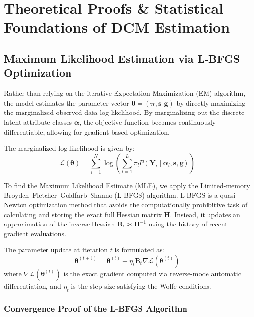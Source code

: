 \documentclass[11pt,a4paper]{article}
\begin{document}
\section{Theoretical Proofs \& Statistical Foundations of DCM Estimation}

\subsection{Maximum Likelihood Estimation via L-BFGS Optimization}

Rather than relying on the iterative Expectation-Maximization (EM) algorithm, 
the model estimates the parameter vector $\boldsymbol{\theta} = (\boldsymbol{\pi}, \mathbf{s}, \mathbf{g})$ 
by directly maximizing the marginalized observed-data log-likelihood. 
By marginalizing out the discrete latent attribute classes $\boldsymbol{\alpha}$, 
the objective function becomes continuously differentiable, allowing for 
gradient-based optimization. 

The marginalized log-likelihood is given by:
\begin{equation}
\mathcal{L}(\boldsymbol{\theta}) = \sum_{i=1}^N \log \left( \sum_{l=1}^L \pi_l P(\mathbf{Y}_i \mid \boldsymbol{\alpha}_l, \mathbf{s}, \mathbf{g}) \right)
\end{equation}

To find the Maximum Likelihood Estimate (MLE), we apply the Limited-memory 
Broyden–Fletcher–Goldfarb–Shanno (L-BFGS) algorithm. L-BFGS is a 
quasi-Newton optimization method that avoids the computationally 
prohibitive task of calculating and storing the exact full Hessian 
matrix $\mathbf{H}$. Instead, it updates an approximation of the inverse 
Hessian $\mathbf{B}_t \approx \mathbf{H}^{-1}$ using the history of recent 
gradient evaluations. 

The parameter update at iteration $t$ is formulated as:
\begin{equation}
\boldsymbol{\theta}^{(t+1)} = \boldsymbol{\theta}^{(t)} + \eta_t \mathbf{B}_t \nabla \mathcal{L}(\boldsymbol{\theta}^{(t)})
\end{equation}
where $\nabla \mathcal{L}(\boldsymbol{\theta}^{(t)})$ is the exact 
gradient computed via reverse-mode automatic differentiation, 
and $\eta_t$ is the step size satisfying the Wolfe conditions.

\subsubsection{Convergence Proof of the L-BFGS Algorithm}
\end{document}
